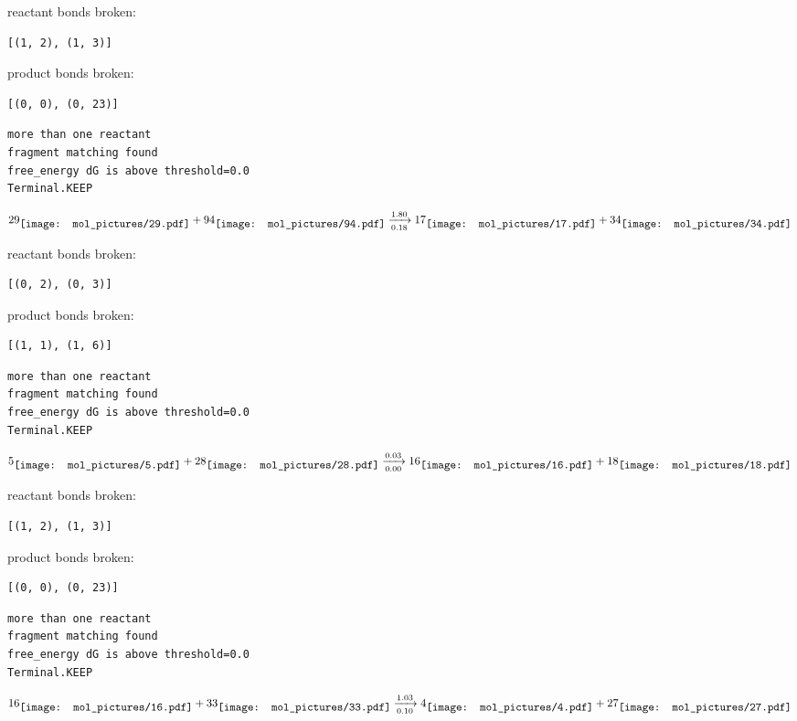 \documentclass{article}
\begin{document}
reactant bonds broken:\begin{verbatim}
[(1, 2), (1, 3)]
\end{verbatim}
product bonds broken:\begin{verbatim}
[(0, 0), (0, 23)]
\end{verbatim}




\vspace{1cm}
\begin{verbatim}
more than one reactant
fragment matching found
free_energy dG is above threshold=0.0
Terminal.KEEP
\end{verbatim}
$$
29
\raisebox{-.5\height}{\texttt{[image: mol\_pictures/29.pdf]}}
+
94
\raisebox{-.5\height}{\texttt{[image: mol\_pictures/94.pdf]}}
\xrightarrow[0.18]{1.80}
17
\raisebox{-.5\height}{\texttt{[image: mol\_pictures/17.pdf]}}
+
34
\raisebox{-.5\height}{\texttt{[image: mol\_pictures/34.pdf]}}
$$


reactant bonds broken:\begin{verbatim}
[(0, 2), (0, 3)]
\end{verbatim}
product bonds broken:\begin{verbatim}
[(1, 1), (1, 6)]
\end{verbatim}




\vspace{1cm}
\begin{verbatim}
more than one reactant
fragment matching found
free_energy dG is above threshold=0.0
Terminal.KEEP
\end{verbatim}
$$
5
\raisebox{-.5\height}{\texttt{[image: mol\_pictures/5.pdf]}}
+
28
\raisebox{-.5\height}{\texttt{[image: mol\_pictures/28.pdf]}}
\xrightarrow[0.00]{0.03}
16
\raisebox{-.5\height}{\texttt{[image: mol\_pictures/16.pdf]}}
+
18
\raisebox{-.5\height}{\texttt{[image: mol\_pictures/18.pdf]}}
$$


reactant bonds broken:\begin{verbatim}
[(1, 2), (1, 3)]
\end{verbatim}
product bonds broken:\begin{verbatim}
[(0, 0), (0, 23)]
\end{verbatim}




\vspace{1cm}
\begin{verbatim}
more than one reactant
fragment matching found
free_energy dG is above threshold=0.0
Terminal.KEEP
\end{verbatim}
$$
16
\raisebox{-.5\height}{\texttt{[image: mol\_pictures/16.pdf]}}
+
33
\raisebox{-.5\height}{\texttt{[image: mol\_pictures/33.pdf]}}
\xrightarrow[0.10]{1.03}
4
\raisebox{-.5\height}{\texttt{[image: mol\_pictures/4.pdf]}}
+
27
\raisebox{-.5\height}{\texttt{[image: mol\_pictures/27.pdf]}}
$$
\end{document}
